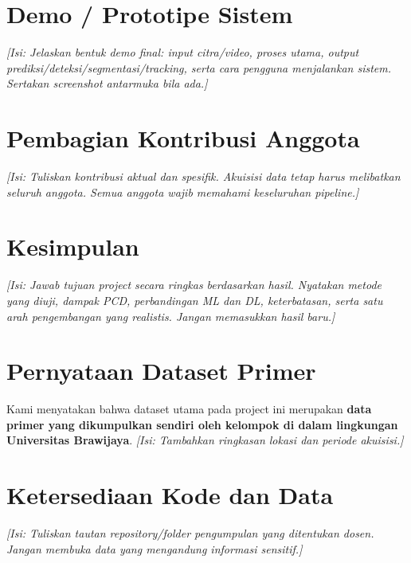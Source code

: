 \documentclass[10pt,twocolumn,a4paper]{article}
\newcommand{\isian}[1]{\textcolor{notegray}{\textit{[Isi: #1]}}}
\begin{document}
\section{Demo / Prototipe Sistem}
\isian{Jelaskan bentuk demo final: input citra/video, proses utama, output prediksi/deteksi/segmentasi/tracking, serta cara pengguna menjalankan sistem. Sertakan screenshot antarmuka bila ada.}

\section{Pembagian Kontribusi Anggota}
\begin{table}[H]
\centering
\caption{Kontribusi anggota kelompok.}
\label{tab:contribution}
\end{table}
\isian{Tuliskan kontribusi aktual dan spesifik. Akuisisi data tetap harus melibatkan seluruh anggota. Semua anggota wajib memahami keseluruhan pipeline.}

\section{Kesimpulan}
\isian{Jawab tujuan project secara ringkas berdasarkan hasil. Nyatakan metode yang diuji, dampak PCD, perbandingan ML dan DL, keterbatasan, serta satu arah pengembangan yang realistis. Jangan memasukkan hasil baru.}

\section*{Pernyataan Dataset Primer}
Kami menyatakan bahwa dataset utama pada project ini merupakan \textbf{data primer yang dikumpulkan sendiri oleh kelompok di dalam lingkungan Universitas Brawijaya}. \isian{Tambahkan ringkasan lokasi dan periode akuisisi.}

\section*{Ketersediaan Kode dan Data}
\isian{Tuliskan tautan repository/folder pengumpulan yang ditentukan dosen. Jangan membuka data yang mengandung informasi sensitif.}



\end{document}
